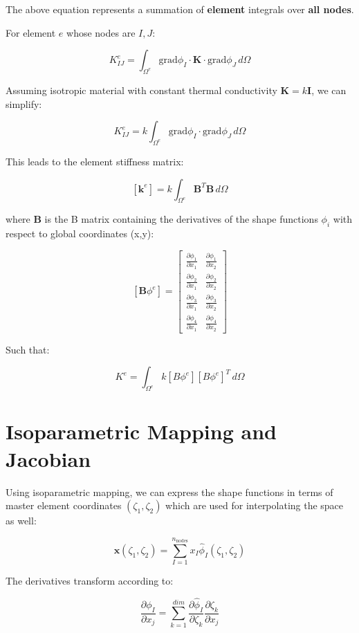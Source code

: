 \documentclass[
  11pt,
  a4paper,
]{scrbook}
\begin{document}
The above equation represents a summation of \textbf{element} integrals
over \textbf{all nodes}.

For element \(e\) whose nodes are \(I,J\):

\[K_{IJ}^e = \int_{\Omega^e}\text{grad}{\phi_I} \cdot \mathbf{K} \cdot \text{grad}{\phi_J} \, d\Omega\]

Assuming isotropic material with constant thermal conductivity
\(\mathbf{K} = k \mathbf{I}\), we can simplify:

\[K_{IJ}^e = k \int_{\Omega^e}\text{grad}{\phi_I} \cdot \text{grad}{\phi_J} \, d\Omega\]

This leads to the element stiffness matrix:

\[[\mathbf{k}^e] = k \int_{\Omega^e} \mathbf{B}^T \mathbf{B} \, d\Omega\]

where \(\mathbf{B}\) is the B matrix containing the derivatives of the
shape functions \(\phi_i\) with respect to global coordinates (x,y):

\[[\mathbf{B}\phi^e] = \begin{bmatrix} \frac{\partial \phi_1}{\partial x_1} & \frac{\partial \phi_1}{\partial x_2} \\ \frac{\partial \phi_2}{\partial x_1} & \frac{\partial \phi_2}{\partial x_2} \\ \frac{\partial \phi_3}{\partial x_1} & \frac{\partial \phi_3}{\partial x_2} \\ \frac{\partial \phi_4}{\partial x_1} & \frac{\partial \phi_4}{\partial x_2} \end{bmatrix}\]

Such that:

\[K^e=\int_{\Omega^e}k[B\phi^e][B\phi^e]^T \, d\Omega\]

\section{Isoparametric Mapping and
Jacobian}\label{isoparametric-mapping-and-jacobian}

Using isoparametric mapping, we can express the shape functions in terms
of master element coordinates \((\zeta_1, \zeta_2)\) which are used for
interpolating the space as well:

\[\mathbf{x}(\zeta_1, \zeta_2) = \sum_{I=1}^{n_{\text{nodes}}} x_I\hat{\phi}_I(\zeta_1, \zeta_2)\]

The derivatives transform according to:

\[\frac{\partial\phi_I}{\partial x_j}= \sum_{k=1}^{dim}\frac{\partial\hat{\phi}_I}{\partial \zeta_k}\frac{\partial \zeta_k}{\partial x_j}\]
\end{document}
